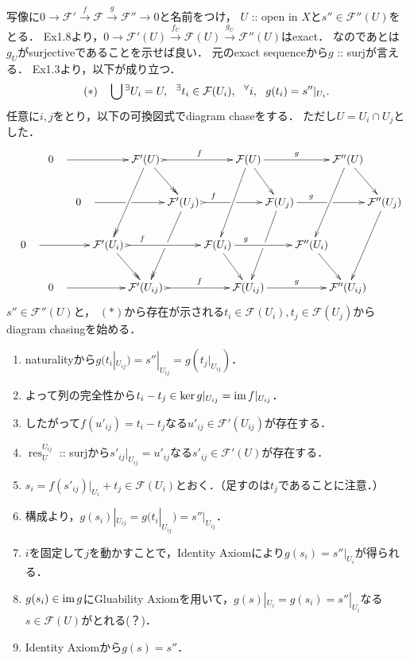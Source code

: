 \documentclass[a4paper]{jsarticle}
\newcommand{\shF}{\mathcal{F}}
\newcommand{\res}{\operatorname{res}}
\begin{document}
    写像に$0 \to \shF' \xrightarrow{f} \shF \xrightarrow{g} \shF'' \to 0$と名前をつけ，
    $U$ :: open in $X$と$s'' \in \shF''(U)$をとる．
    Ex1.8より，$0 \to \shF'(U) \xrightarrow{f_U} \shF(U) \xrightarrow{g_U} \shF''(U)$はexact．
    なのであとは$g_U$がsurjectiveであることを示せば良い．
    元のexact sequenceから$g$ :: surjが言える．
    Ex1.3より，以下が成り立つ．
    \[
        (*)~~~
        \bigcup {}^\exists U_i=U,~~
        \Exists{t_i \in \shF(U_i)}
        \Forall{i} g(t_i)=s''|_{U_i}.
    \]
    任意に$i,j$をとり，以下の可換図式でdiagram chaseをする．
    ただし$U=U_i \cap U_j$とした．
    \[
    \xymatrix@C=-5pt
    {
        {} & ~~~0~~~ \ar[rrr] & {} & {} & \shF'(U)~ \ar@{->>}[rd] \ar@{->>}[ldd] \ar@{>->}[rrr]^-{f} & {} & {} & \shF(U) \ar[rd] \ar[ldd] \ar[rrr]^-{g} & {} & {} & \shF''(U) \ar[rd] \ar[ldd] & {} \\
        {} & {} & ~~~0~~~ \ar[rrr]|(0.47)\hole & {} & {} & \shF'(U_j)~ \ar@{->>}[ldd]|(0.50)\hole \ar@{>->}[rrr]|(0.51)\hole^(0.3){f} & {} & {} & \shF(U_j) \ar[ldd]|(0.50)\hole \ar[rrr]|(0.48)\hole^(0.3){g} & {} & {} & \shF''(U_j) \ar[ldd]& {} \\
        ~~~0~~~ \ar[rrr] & {} & {} & \shF'(U_i)~ \ar@{->>}[rd]\ar@{>->}[rrr]^(0.3){f} & {} & {} & \shF(U_i) \ar[rd]\ar[rrr]^(0.3){g} & {} & {} & \shF''(U_i) \ar[rd]& {} \\
        {} & ~~~0~~~ \ar[rrr] & {} & {} & \shF'(U_{ij})~ \ar@{>->}[rrr]^-{f} & {} & {} & \shF(U_{ij}) \ar[rrr]^-{g} & {} & {} & \shF''(U_{ij})& {} \\
    }
    \]
    $s'' \in \shF''(U)$と，
    $(*)$から存在が示される$t_i \in \shF(U_i), t_j \in \shF(U_j)$から
    diagram chasingを始める．
    \begin{enumerate}[(1)]
    \setlength{\itemindent}{2em}
        \item naturalityから$g (t_i|_{U_{ij}})=s''|_{U_{ij}}=g(t_j|_{U_{ij}})$．
        \item よって列の完全性から$t_i-t_j \in \ker g|_{U_{ij}}=\operatorname{im} f|_{U_{ij}}$．
        \item したがって$f(u'_{ij})=t_i-t_j$なる$u'_{ij} \in \shF'(U_{ij})$が存在する．
        \item $\res_U^{U_{ij}}$ :: surjから$s'_{ij}|_{U_{ij}}=u'_{ij}$なる$s'_{ij} \in \shF'(U)$が存在する．
        \item $s_{i}=f(s'_{ij})|_{U_i}+t_j \in \shF(U_i)$とおく．（足すのは$t_j$であることに注意．）
        \item 構成より，$g(s_i)|_{U_{ij}}=g(t_i|_{U_{ij}})=s''|_{U_{ij}}$．
        \item $i$を固定して$j$を動かすことで，Identity Axiomにより$g(s_i)=s''|_{U_i}$が得られる．
        \item $g(s_i) \in \operatorname{im} g$にGluability Axiomを用いて，$g(s)|_{U_i}=g(s_i)=s''|_{U_i}$なる$s \in \shF(U)$がとれる(？)．
        \item Identity Axiomから$g(s)=s''$．
    \end{enumerate}
\end{document}
